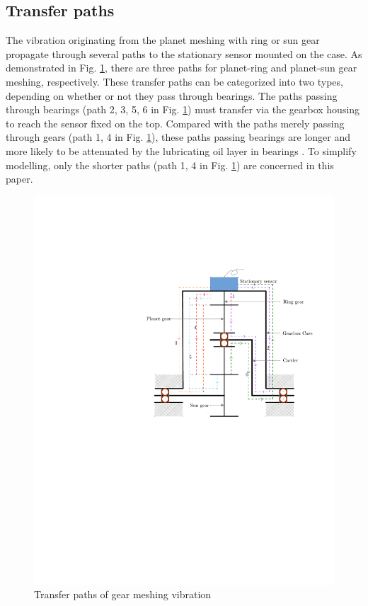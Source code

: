 \documentclass[a4paper,fleqn]{cas-sc}%
\begin{document}
\subsection{Transfer paths}
\par The vibration originating from the planet meshing with ring or sun gear propagate through several paths to the stationary sensor mounted on the case. As demonstrated in Fig. \ref{fig:transfer_path}, there are three paths for planet-ring and planet-sun gear meshing, respectively. These transfer paths can be categorized into two types, depending on whether or not they pass through bearings. The paths passing through bearings (path 2, 3, 5, 6 in Fig. \ref{fig:transfer_path}) must transfer via the gearbox housing to reach the sensor fixed on the top. Compared with the paths merely passing through gears (path 1, 4 in Fig. \ref{fig:transfer_path}), these paths passing bearings are longer and more likely to be attenuated by the lubricating oil layer in bearings \cite{Feng2012}. To simplify modelling, only the shorter paths (path 1, 4 in Fig. \ref{fig:transfer_path}) are concerned in this paper.
\begin{figure}[pos=htbp]
    \centering
    \includegraphics[scale=0.5]{transfer_path.pdf}
    \caption{Transfer paths of gear meshing vibration\label{fig:transfer_path}}
\end{figure}
\end{document}
